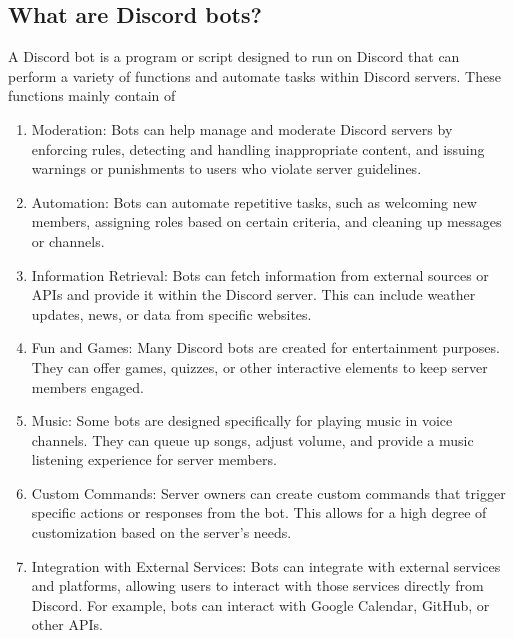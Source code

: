 \subsection{What are Discord bots?}
A Discord bot is a program or script designed to run on Discord that can perform a variety of functions and automate tasks within Discord servers. These functions mainly contain of 
\begin{enumerate}
	\item Moderation: Bots can help manage and moderate Discord servers by enforcing rules, detecting and handling inappropriate content, and issuing warnings or punishments to users who violate server guidelines.
	\item Automation: Bots can automate repetitive tasks, such as welcoming new members, assigning roles based on certain criteria, and cleaning up messages or channels.
	\item Information Retrieval: Bots can fetch information from external sources or APIs and provide it within the Discord server. This can include weather updates, news, or data from specific websites.
	\item Fun and Games: Many Discord bots are created for entertainment purposes. They can offer games, quizzes, or other interactive elements to keep server members engaged.
	\item Music: Some bots are designed specifically for playing music in voice channels. They can queue up songs, adjust volume, and provide a music listening experience for server members.
	\item Custom Commands: Server owners can create custom commands that trigger specific actions or responses from the bot. This allows for a high degree of customization based on the server's needs.
	\item Integration with External Services: Bots can integrate with external services and platforms, allowing users to interact with those services directly from Discord. For example, bots can interact with Google Calendar, GitHub, or other APIs. \cite{agnihotri2022discord}
\end{enumerate}

